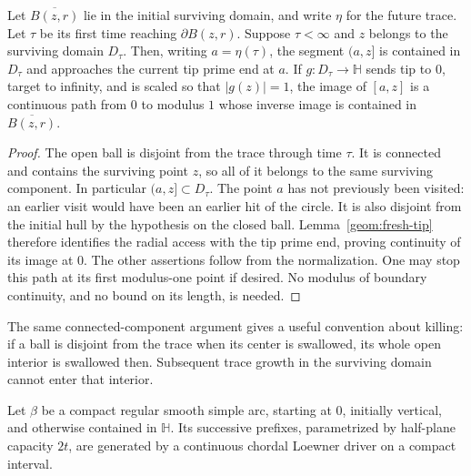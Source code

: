 \begin{lemma}
\label{geom:first-hit-access}
Let $\overline{B(z,r)}$ lie in the initial surviving domain, and write
$\eta$ for the future trace. Let $\tau$ be its first time reaching
$\partial B(z,r)$.
Suppose $\tau<\infty$ and $z$ belongs to the surviving domain $D_\tau$.
Then, writing $a=\eta(\tau)$, the segment $(a,z]$ is contained in
$D_\tau$ and approaches the current tip prime end at $a$.
If $g:D_\tau\to\mathbb H$ sends tip to $0$, target to infinity,
and is scaled so that $|g(z)|=1$, the image of $[a,z]$ is a continuous
path from $0$ to modulus $1$ whose inverse image is contained in
$\overline{B(z,r)}$.
\end{lemma}

\begin{proof}
The open ball is disjoint from the trace through time $\tau$.
It is connected and contains the surviving point $z$, so all of it
belongs to the same surviving component.  In particular $(a,z]\subset
D_\tau$.  The point $a$ has not previously been visited: an earlier
visit would have been an earlier hit of the circle.  It is also
disjoint from the initial hull by the hypothesis on the closed ball.
Lemma~\ref{geom:fresh-tip} therefore identifies the radial access
with the tip prime end, proving continuity of its image at $0$.
The other assertions follow from the normalization.  One may stop this
path at its first modulus-one point if desired.  No modulus of boundary
continuity, and no bound on its length, is needed.
\end{proof}

The same connected-component argument gives a useful convention about
killing: if a ball is disjoint from the trace when its center is
swallowed, its whole open interior is swallowed then.  Subsequent
trace growth in the surviving domain cannot enter that interior.

\begin{lemma}
\label{geom:smooth-driver}
Let $\beta$ be a compact regular smooth simple arc, starting at $0$,
initially vertical, and otherwise contained in $\mathbb H$.  Its
successive prefixes, parametrized by half-plane capacity $2t$, are
generated by a continuous chordal Loewner driver on a compact interval.
\end{lemma}

